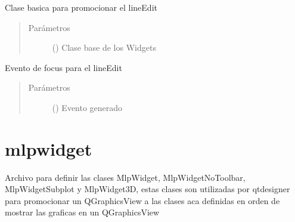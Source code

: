\documentclass[letterpaper,10pt,spanish]{sphinxmanual}
\begin{document}
\begin{fulllineitems}
\label{\detokenize{codigos/Promociones:focusLineEdit.FocusLineEdit}}
Clase basica para promocionar el lineEdit
\begin{quote}\begin{description}
\item[{Parámetros}] \leavevmode
{} () \textendash{} Clase base de los Widgets

\end{description}\end{quote}

\begin{fulllineitems}
\label{\detokenize{codigos/Promociones:focusLineEdit.FocusLineEdit.focusInEvent}}
Evento de focus para el lineEdit
\begin{quote}\begin{description}
\item[{Parámetros}] \leavevmode
{} () \textendash{} Evento generado

\end{description}\end{quote}

\end{fulllineitems}


\end{fulllineitems}



\section{mlpwidget}
\label{\detokenize{codigos/Promociones:module-mlpwidget}}\label{\detokenize{codigos/Promociones:mlpwidget}}
Archivo para definir las clases MlpWidget, MlpWidgetNoToolbar, MlpWidgetSubplot y MlpWidget3D, estas clases son utilizadas por qtdesigner para promocionar un QGraphicsView a las clases aca definidas en orden de mostrar las graficas en un QGraphicsView
\end{document}

